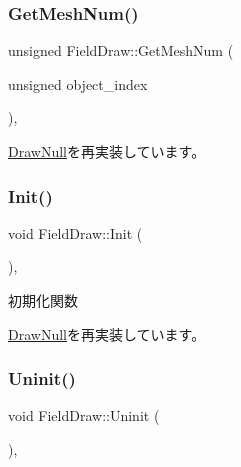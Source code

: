\subsubsection{\texorpdfstring{Get\+Mesh\+Num()}{GetMeshNum()}}
{\footnotesize\ttfamily unsigned Field\+Draw\+::\+Get\+Mesh\+Num (\begin{DoxyParamCaption}\item[{unsigned}]{object\+\_\+index }\end{DoxyParamCaption})\hspace{0.3cm}{\ttfamily [override]}, {\ttfamily [virtual]}}



\mbox{\hyperlink{class_draw_null_ad735978a85a5f3583eecd82d6bfe6413}{Draw\+Null}}を再実装しています。

\mbox{\label{class_field_draw_a4287d2ce33033b2413c1d3a81b173373}} 
\subsubsection{\texorpdfstring{Init()}{Init()}}
{\footnotesize\ttfamily void Field\+Draw\+::\+Init (\begin{DoxyParamCaption}{ }\end{DoxyParamCaption})\hspace{0.3cm}{\ttfamily [override]}, {\ttfamily [virtual]}}



初期化関数 



\mbox{\hyperlink{class_draw_null_acd7fef3ccea1da537ac9507ffbb6dd2e}{Draw\+Null}}を再実装しています。

\mbox{\label{class_field_draw_a89a78212c141714d9e39e25e663aaeff}} 
\subsubsection{\texorpdfstring{Uninit()}{Uninit()}}
{\footnotesize\ttfamily void Field\+Draw\+::\+Uninit (\begin{DoxyParamCaption}{ }\end{DoxyParamCaption})\hspace{0.3cm}{\ttfamily [override]}, {\ttfamily [virtual]}}




